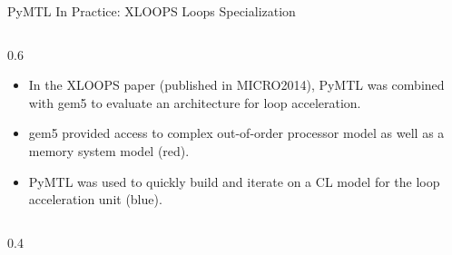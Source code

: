 \begin{frame}{PyMTL In Practice: XLOOPS Loops Specialization}

  \begin{cbxcols}
  \begin{column}{0.6\tw}

\begin{itemize}
  \item In the XLOOPS paper (published in MICRO2014), PyMTL was
        combined with gem5 to evaluate an architecture for loop
        acceleration.
  \item gem5 provided access to complex out-of-order processor model as
        well as a memory system model (red).
  \item PyMTL was used to quickly build and iterate on a CL model for the
        loop acceleration unit (blue).

  {\tiny{}}
\end{itemize}
  \end{column}
  \begin{column}{0.4\tw}

  \vspace{0.2in}

  \end{column}
  \end{cbxcols}

\end{frame}


